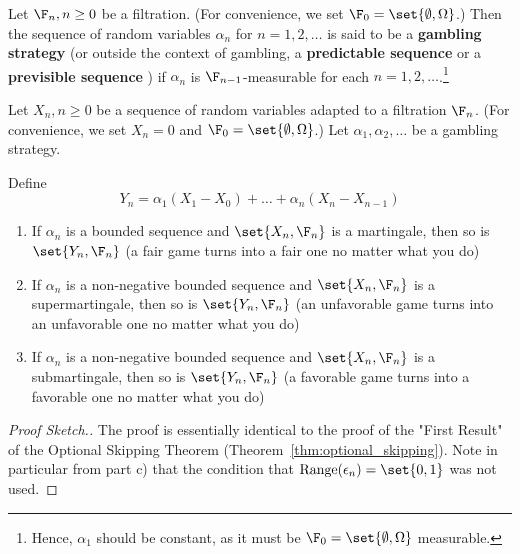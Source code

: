\documentclass{article} %
\begin{document}
\begin{definition}
Let $\F_n, n \geq 0$ be a filtration.  (For convenience, we set $\F_0  = \set{\emptyset, \Omega}$.) Then the sequence of random variables $\alpha_n$ for $n=1,2,\hdots$ is said to be a \textbf{gambling strategy} \cite[pp.52]{brzezniak2000basic} (or outside the context of gambling, a \textbf{predictable sequence} \cite[pp.234]{durrett2010probability} or a \textbf{previsible sequence} \cite[pp.52]{brzezniak2000basic}) if $\alpha_n$ is $\F_{n-1}$-measurable for each $n=1,2,\hdots$.\footnote{Hence, $\alpha_1$ should be constant, as it must be $\F_0  = \set{\emptyset, \Omega}$ measurable.}
\label{def:predictable_sequence}	
\end{definition}

\begin{proposition}
\cite[Prop 3.1]{brzezniak2000basic}  Let $X_n, n \geq 0$ be a sequence of random variables adapted to a filtration $\F_n$.  (For convenience, we set $X_n =0$ and $\F_0 = \set{\emptyset, \Omega}$.) Let $\alpha_1, \alpha_2, \hdots$ be a gambling strategy.  

Define 
\[Y_n = \alpha_1 (X_1-X_0) + \hdots + \alpha_n (X_n - X_{n-1}) \]

\begin{enumerate}
	\item If $\alpha_n$ is a bounded sequence and $\set{X_n, \F_n}$ is a martingale, then so is $\set{Y_n, \F_n}$ (a fair game turns into a fair one no matter what you do)
	\item If $\alpha_n$ is a non-negative bounded sequence and $\set{X_n, \F_n}$ is a supermartingale, then so is $\set{Y_n, \F_n}$ (an unfavorable game turns into an unfavorable one no matter what you do)
	\item  If $\alpha_n$ is a non-negative bounded sequence and $\set{X_n, \F_n}$ is a submartingale, then so is $\set{Y_n, \F_n}$ (a favorable game turns into a favorable one no matter what you do)
\end{enumerate} 
\label{prop:gambling_strategies_cannot_flip_martingale_valence}	
\end{proposition}

\begin{proof}[Proof Sketch.]
The proof is essentially identical to the proof of the "First Result" of  the Optional Skipping  Theorem (Theorem~\ref{thm:optional_skipping}). Note in particular from part c) that the condition that $\text{Range}(\epsilon_n)=\set{0,1}$ was not used. 
\end{proof}
\end{document}
